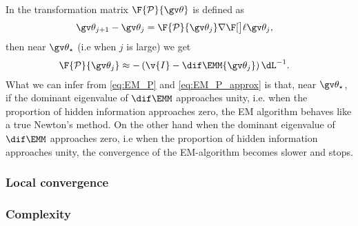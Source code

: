 In \textcite{Salakhutdinov2004,Salakhutdinov2003} the transformation matrix $\F{\mathcal P}{\Th}$ is defined as
\begin{align}
	\Th_{j+1}-\Th_j &= \F{\mathcal P}{\Th_j}\nabla\lLH[\Th_j],
	\label{eq:EM_P}
\end{align}
then near $\Th_\star$ (i.e when $j$ is large)
we get
\begin{align}
		\F{\mathcal P}{\Th_j}&\approx -\left(\v{I}-\dif\EMM{\Th_j}\right)\dL^{-1}.
		\label{eq:EM_P_approx}
\end{align}
What we can infer from \eqref{eq:EM_P} and \eqref{eq:EM_P_approx} is that, near $\Th_\star$, if the dominant eigenvalue
of $\dif\EMM$ approaches unity, i.e. when the proportion of hidden information approaches zero, the EM algorithm behaves like 
a true Newton's method. On the other hand when the dominant 
eigenvalue of $\dif\EMM$ approaches zero, i.e when the proportion of hidden information approaches unity, the convergence 
of the EM-algorithm becomes slower and stops. 


\parencite{Wu1983,Sandell1978,Meng1997,Elliott1999,Olsson2007,Paninski2010}

\subsubsection{Local convergence}

\subsubsection{Complexity}

\parencite{Harvey1990,Watson1983,Cappe2005,Saatci2011,Olsson2007}

